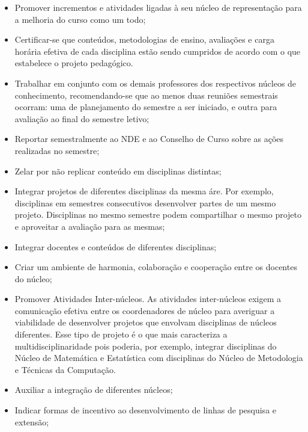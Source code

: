 \begin{itemize}

\item Promover incrementos e atividades ligadas à seu núcleo de representação para a melhoria do curso como um todo;

\item Certificar-se que conteúdos, metodologias de ensino, avaliações e carga horária efetiva de cada disciplina estão sendo cumpridos de acordo com o que estabelece o projeto pedagógico. 

\item Trabalhar em conjunto com os demais professores dos respectivos núcleos de conhecimento, recomendando-se que ao menos duas reuniões semestrais ocorram: uma de planejamento do semestre a ser iniciado, e outra para avaliação ao final do semestre letivo;

\item Reportar semestralmente ao NDE e ao Conselho de Curso sobre as ações realizadas no semestre;

\item Zelar por não replicar conteúdo em disciplinas distintas;

\item Integrar projetos de diferentes disciplinas da mesma áre. Por exemplo, disciplinas em semestres consecutivos desenvolver partes de um mesmo projeto. Disciplinas no mesmo semestre podem compartilhar o mesmo projeto e aproveitar a avaliação para as mesmas;

\item Integrar docentes e conteúdos de diferentes disciplinas;
    
\item Criar um ambiente de harmonia, colaboração e cooperação entre os docentes do núcleo;

\item Promover Atividades Inter-núcleos.
    As atividades inter-núcleos exigem a comunicação efetiva entre os coordenadores de núcleo para averiguar a viabilidade de desenvolver projetos que envolvam disciplinas de núcleos diferentes. Esse tipo de projeto é o que mais caracteriza a multidisciplinaridade pois poderia, por exemplo, integrar disciplinas do Núcleo de Matemática e Estatística com disciplinas do Núcleo de Metodologia e Técnicas da Computação.  

\item Auxiliar a integração de diferentes núcleos;

\item Indicar formas de incentivo ao desenvolvimento de linhas de pesquisa e extensão;

\end{itemize}



